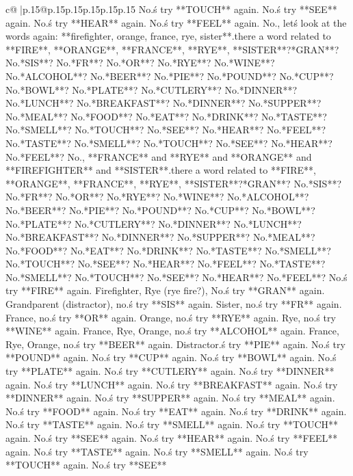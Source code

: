 \documentclass{article}
\begin{document}
{\begin{supertabular}{c@{$\;$}|p{.15\linewidth}@{}p{.15\linewidth}p{.15\linewidth}p{.15\linewidth}p{.15\linewidth}p{.15\linewidth}}
{{{No.\nLet\'s try **TOUCH** again. No.\nLet\'s try **SEE** again. No.\nLet\'s try **HEAR** again. No.\nLet\'s try **FEEL** again. No.\n\nOkay, let\'s look at the words again: **firefighter, orange, france, rye, sister**.\nIs there a word related to **FIRE**, **ORANGE**, **FRANCE**, **RYE**, **SISTER**?\nMaybe **GRAN**? No.\nMaybe **SIS**? No.\nMaybe **FR**? No.\nMaybe **OR**? No.\nMaybe **RYE**? No.\nMaybe **WINE**? No.\nMaybe **ALCOHOL**? No.\nMaybe **BEER**? No.\nMaybe **PIE**? No.\nMaybe **POUND**? No.\nMaybe **CUP**? No.\nMaybe **BOWL**? No.\nMaybe **PLATE**? No.\nMaybe **CUTLERY**? No.\nMaybe **DINNER**? No.\nMaybe **LUNCH**? No.\nMaybe **BREAKFAST**? No.\nMaybe **DINNER**? No.\nMaybe **SUPPER**? No.\nMaybe **MEAL**? No.\nMaybe **FOOD**? No.\nMaybe **EAT**? No.\nMaybe **DRINK**? No.\nMaybe **TASTE**? No.\nMaybe **SMELL**? No.\nMaybe **TOUCH**? No.\nMaybe **SEE**? No.\nMaybe **HEAR**? No.\nMaybe **FEEL**? No.\nMaybe **TASTE**? No.\nMaybe **SMELL**? No.\nMaybe **TOUCH**? No.\nMaybe **SEE**? No.\nMaybe **HEAR**? No.\nMaybe **FEEL**? No.\n\nWait, **FRANCE** and **RYE** and **ORANGE** and **FIREFIGHTER** and **SISTER**.\nIs there a word related to **FIRE**, **ORANGE**, **FRANCE**, **RYE**, **SISTER**?\nMaybe **GRAN**? No.\nMaybe **SIS**? No.\nMaybe **FR**? No.\nMaybe **OR**? No.\nMaybe **RYE**? No.\nMaybe **WINE**? No.\nMaybe **ALCOHOL**? No.\nMaybe **BEER**? No.\nMaybe **PIE**? No.\nMaybe **POUND**? No.\nMaybe **CUP**? No.\nMaybe **BOWL**? No.\nMaybe **PLATE**? No.\nMaybe **CUTLERY**? No.\nMaybe **DINNER**? No.\nMaybe **LUNCH**? No.\nMaybe **BREAKFAST**? No.\nMaybe **DINNER**? No.\nMaybe **SUPPER**? No.\nMaybe **MEAL**? No.\nMaybe **FOOD**? No.\nMaybe **EAT**? No.\nMaybe **DRINK**? No.\nMaybe **TASTE**? No.\nMaybe **SMELL**? No.\nMaybe **TOUCH**? No.\nMaybe **SEE**? No.\nMaybe **HEAR**? No.\nMaybe **FEEL**? No.\nMaybe **TASTE**? No.\nMaybe **SMELL**? No.\nMaybe **TOUCH**? No.\nMaybe **SEE**? No.\nMaybe **HEAR**? No.\nMaybe **FEEL**? No.\n\nLet\'s try **FIRE** again. Firefighter, Rye (rye fire?), No.\nLet\'s try **GRAN** again. Grandparent (distractor), no.\nLet\'s try **SIS** again. Sister, no.\nLet\'s try **FR** again. France, no.\nLet\'s try **OR** again. Orange, no.\nLet\'s try **RYE** again. Rye, no.\nLet\'s try **WINE** again. France, Rye, Orange, no.\nLet\'s try **ALCOHOL** again. France, Rye, Orange, no.\nLet\'s try **BEER** again. Distractor.\nLet\'s try **PIE** again. No.\nLet\'s try **POUND** again. No.\nLet\'s try **CUP** again. No.\nLet\'s try **BOWL** again. No.\nLet\'s try **PLATE** again. No.\nLet\'s try **CUTLERY** again. No.\nLet\'s try **DINNER** again. No.\nLet\'s try **LUNCH** again. No.\nLet\'s try **BREAKFAST** again. No.\nLet\'s try **DINNER** again. No.\nLet\'s try **SUPPER** again. No.\nLet\'s try **MEAL** again. No.\nLet\'s try **FOOD** again. No.\nLet\'s try **EAT** again. No.\nLet\'s try **DRINK** again. No.\nLet\'s try **TASTE** again. No.\nLet\'s try **SMELL** again. No.\nLet\'s try **TOUCH** again. No.\nLet\'s try **SEE** again. No.\nLet\'s try **HEAR** again. No.\nLet\'s try **FEEL** again. No.\nLet\'s try **TASTE** again. No.\nLet\'s try **SMELL** again. No.\nLet\'s try **TOUCH** again. No.\nLet\'s try **SEE** }}}
\end{supertabular}}
\end{document}

